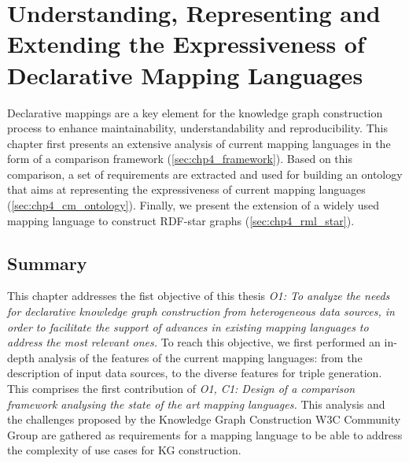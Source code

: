 
\chapter{Understanding, Representing and Extending the Expressiveness of Declarative Mapping Languages}
\label{chapter:mappings}

Declarative mappings are a key element for the knowledge graph construction process to enhance maintainability, understandability and reproducibility. This chapter first presents an extensive analysis of current mapping languages in the form of a comparison framework (\cref{sec:chp4_framework}). Based on this comparison, a set of requirements are extracted and used for building an ontology that aims at representing the expressiveness of current mapping languages (\cref{sec:chp4_cm_ontology}). Finally, we present the extension of a widely used mapping language to construct RDF-star graphs (\cref{sec:chp4_rml_star}).








\section{Summary}

This chapter addresses the fist objective of this thesis \textit{O1: To analyze the needs for declarative knowledge graph construction from heterogeneous data sources, in order to facilitate the support of advances in existing mapping languages to address the most relevant ones.} 
To reach this objective, we first performed an in-depth analysis of the features of the current mapping languages: from the description of input data sources, to the diverse features for triple generation. This comprises the first contribution of \textit{O1, C1: Design of a comparison framework analysing the state of the art mapping languages.}
This analysis and the challenges proposed by the Knowledge Graph Construction W3C Community Group are gathered as requirements for a mapping language to be able to address the complexity of use cases for KG construction. 

